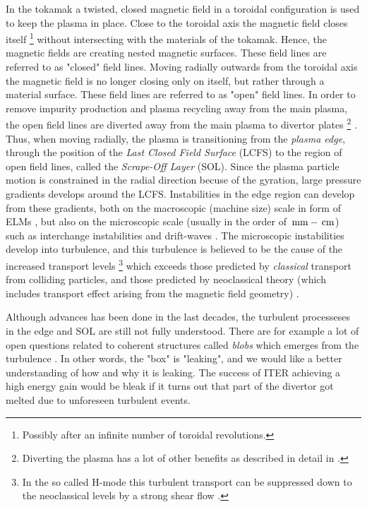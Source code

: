 In the tokamak a twisted, closed magnetic field in a toroidal configuration is used to keep the plasma in place.
Close to the toroidal axis the magnetic field closes itself%
%
\footnote{Possibly after an infinite number of toroidal revolutions.}
%
without intersecting with the materials of the tokamak.
Hence, the magnetic fields are creating nested magnetic surfaces.
These field lines are referred to as "closed" field lines.
Moving radially outwards from the toroidal axis the magnetic field is no longer closing only on itself, but rather through a material surface.
These field lines are referred to as "open" field lines.
In order to remove impurity production and plasma recycling away from the main plasma, the open field lines are diverted away from the main plasma to divertor plates%
%
\footnote{Diverting the plasma has a lot of other benefits as described in detail in \cite{Stangeby2000book,Stacey2012book}.}%
%
.
Thus, when moving radially, the plasma is transitioning from the \emph{plasma edge}, through the position of the \emph{Last Closed Field Surface} (LCFS) to the region of open field lines, called the \emph{Scrape-Off Layer} (SOL).
Since the plasma particle motion is constrained in the radial direction becuse of the gyration, large pressure gradients develops around the LCFS.
Instabilities in the edge region can develop from these gradients, both on the macroscopic (machine size) scale in form of ELMs \cite{Zohm1996}, but also on the microscopic scale (usually in the order of $\, \text{mm} - \, \text{cm}$) such as interchange instabilities \cite{Scott2005b} and drift-waves \cite{Tynan2009}.
The microscopic instabilities develop into turbulence, and this turbulence is believed to be the cause of the increased transport levels%
%
\footnote{In the so called H-mode this turbulent transport can be suppressed down to the neoclassical levels by a strong shear flow \cite{Burrell1997}.} %
%
which exceeds those predicted by \emph{classical} transport from colliding particles, and those predicted by neoclassical theory (which includes transport effect arising from the magnetic field geometry) \cite{Wootton1990}.

Although advances has been done in the last decades, the turbulent processeses in the edge and SOL are still not fully understood.
There are for example a lot of open questions related to coherent structures called \emph{blobs} which emerges from the turbulence \cite{DIppolito2011}.
In other words, the "box" is "leaking", and we would like a better understanding of how and why it is leaking.
The success of ITER achieving a high energy gain would be bleak if it turns out that part of the divertor got melted due to unforeseen turbulent events.

